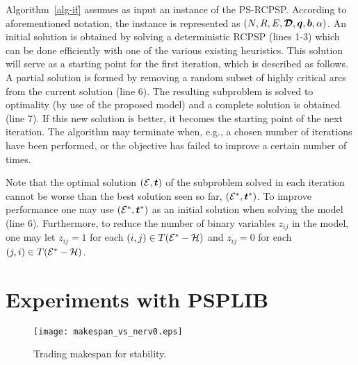  	Algorithm~\ref{alg-if} assumes as input an instance of the
 	PS-RCPSP.
 	According to aforementioned notation,
 	the instance is represented as $(N,R,E,\boldsymbol{\mathcal{D}},\boldsymbol{q},\boldsymbol{b},\alpha)$.
 	An initial solution is obtained by solving a
 	deterministic RCPSP (lines 1-3)
 	which can be done efficiently with one of the various existing heuristics.
 	This solution will serve as a starting point for the first iteration,
 	which is described as follows.
 	A partial solution is formed by removing a random 
 	subset of highly critical arcs from the current solution (line 6).
 	The resulting subproblem is solved to optimality (by use of the proposed model)
 	and a complete solution is obtained (line 7).
 	If this new solution is better,
 	it becomes the starting point of the next iteration.
 	The algorithm may terminate when, e.g., a chosen
 	number of iterations have been performed,
 	or the objective has failed to improve a certain number of times. 
 	
 	Note that the optimal solution $(\mathcal{E},\boldsymbol{t})$   
 	of the subproblem solved in each iteration
 	cannot be worse than the best solution seen so far, $(\mathcal{E}^*,\boldsymbol{t}^*)$.
 	To improve performance one may use $(\mathcal{E}^*,\boldsymbol{t}^*)$ as an initial solution when solving the model (line 6).
 	Furthermore, to reduce the number of binary variables $z_{ij}$ in the model, 
 	one may let $z_{ij}=1$ for each $(i,j) \in T(\mathcal{E}^* -  \mathcal{H})$ and $z_{ij}=0$ for
 	each $(j,i) \in  T(\mathcal{E}^* - \mathcal{H})$.
 	
 	\section{Experiments with PSPLIB}
 	\label{sec-exp}
 	
 	\begin{figure}
 		\centering
 		\texttt{[image: makespan\_vs\_nerv0.eps]}
 		\caption{Trading makespan for stability.}
 		\label{fig-low}
 	\end{figure}
 	
